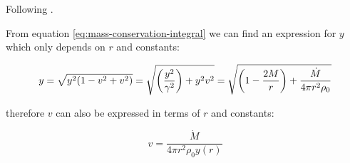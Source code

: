 \documentclass[main.tex]{subfiles}
\begin{document}
Following \textcite[]{ThorneFLammmangZytkow:1981feb}.

From equation \eqref{eq:mass-conservation-integral} we can find an expression \cite[eq. 18a]{ThorneFLammmangZytkow:1981feb} for \(y\) which only depends on \(r\) and constants:

\begin{equation}
  y = \sqrt{y^2 \qty(1 - v^2 + v^2)}
  = \sqrt{\qty(\frac{y^2}{\gamma^2}) + y^2 v^2}
  = \sqrt{\qty(1 - \frac{2M}{r}) + \frac{\dot{M}}{4 \pi r^2 \rho_0}}
\end{equation}

therefore \(v\) can also be expressed in terms of \(r\) and constants:

\begin{equation}
  v = \frac{\dot M}{4 \pi r^2 \rho_0 y(r)}
\end{equation}
\end{document}
